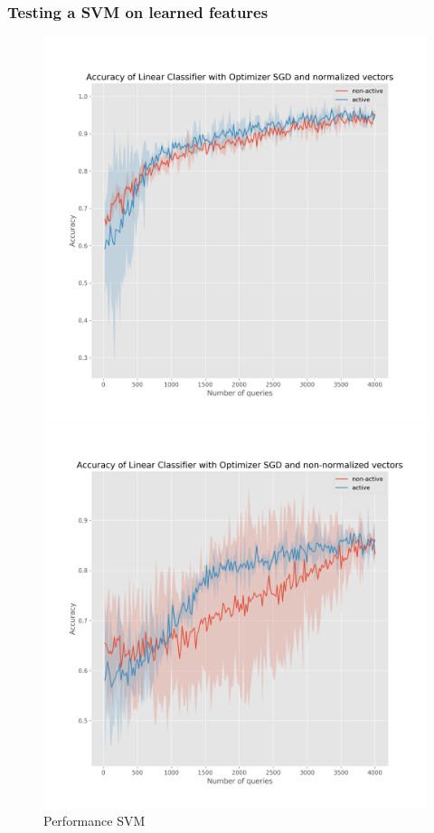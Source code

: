 \documentclass{beamer}
\begin{document}
\begin{frame}
    \frametitle{Testing a SVM on learned features}
\begin{figure}[!h]
    \centering
    \begin{minipage}{.5\textwidth}
      \centering
      \includegraphics[width=\linewidth]{active-vs-base-moons-linear-loss-SGD-normalized-ci}
    \end{minipage}%
    \begin{minipage}{.5\textwidth}
      \centering
      \includegraphics[width=\linewidth]{active-vs-base-moons-linear-loss-SGD-non-normalized-ci}
    \end{minipage}
    \caption{Performance SVM}
  \end{figure}
\end{frame}
\end{document}
